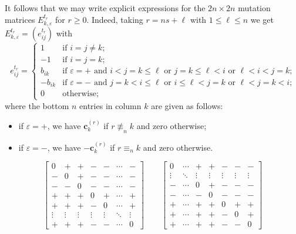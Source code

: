 \documentclass{amsart}
\numberwithin{theorem}{section}
\newcommand{\bfc}{\boldsymbol{c}}
\begin{document}
  It follows that we may write explicit expressions for the $2n\times 2n$ mutation matrices $E^{t_r}_{k,\varepsilon}$ for $r\ge0$.
  Indeed, taking $r=ns+\ell$ with $1 \le \ell \le n$ we get $E^{t_r}_{k,\varepsilon}=(e^{t_r}_{ij})$ with
  \begin{equation}
    \label{eq:preprojective mutation matrices}
    e^{t_r}_{ij}=\begin{cases} 1 & \text{if $i=j\ne k$;}\\ -1 & \text{if $i=j=k$;}\\ b_{ik} & \text{if $\varepsilon=+$ and $i<j=k\le\ell$ or $j=k\le\ell<i$ or $\ell<i<j=k$;}\\ -b_{ik} & \text{if $\varepsilon=-$ and $j=k<i\le\ell$ or $i\le\ell<j=k$ or $\ell<j=k<i$;} \\ 0 & \text{otherwise;} \end{cases}
  \end{equation}
  where the bottom $n$ entries in column $k$ are given as follows:
  \begin{itemize}
    \item if $\varepsilon=+$, we have $\bfc^{(r)}_k$ if $r\not\equiv_n k$ and zero otherwise;
    \item if $\varepsilon=-$, we have $-\bfc^{(r)}_k$ if $r\equiv_n k$ and zero otherwise.
  \end{itemize}

  \[
    \left[\begin{array}{cc|c|cccc}
      0 & + & + & - & - & \cdots & -\\
      - & 0 & + & - & - & \cdots & -\\
      \hline
      - & - & 0 & - & - & \cdots & -\\
      \hline
      + & + & + & 0 & + & \cdots & +\\
      + & + & + & - & 0 & \cdots & +\\
      \vdots & \vdots & \vdots & \vdots & \vdots & \ddots & \vdots\\
      + & + & + & - & - & \cdots & 0
    \end{array}\right]
    \qquad
    \left[\begin{array}{cccc|c|cc}
      0 & \cdots & + & + & - & - & -\\
      \vdots & \ddots & \vdots & \vdots & \vdots & \vdots & \vdots\\
      - & \cdots & 0 & + & - & - & -\\
      - & \cdots & - & 0 & - & - & -\\
      \hline
      + & \cdots & + & + & 0 & + & +\\
      \hline
      + & \cdots & + & + & - & 0 & +\\
      +& \cdots & + & + & - & - & 0
    \end{array}\right]
  \]
\end{document}
